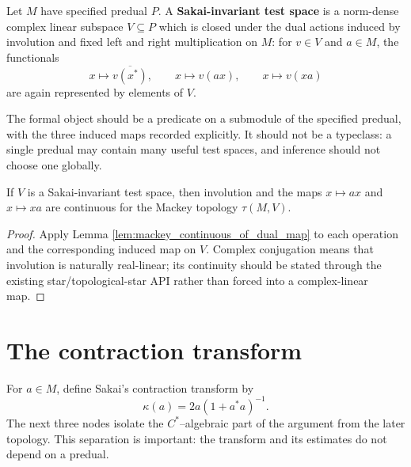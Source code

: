 \begin{definition}
  \label{def:sakai_invariant_test_space}
  \leanok
  Let $M$ have specified predual $P$.  A \textbf{Sakai-invariant test space} is a norm-dense
  complex linear subspace $V\subseteq P$ which is closed under the dual actions induced by
  involution and fixed left and right multiplication on $M$: for $v\in V$ and $a\in M$, the
  functionals
  \[
    x\longmapsto \overline{v(x^{*})},\qquad
    x\longmapsto v(ax),\qquad
    x\longmapsto v(xa)
  \]
  are again represented by elements of $V$.
\end{definition}

The formal object should be a predicate on a submodule of the specified predual, with the three
induced maps recorded explicitly.  It should not be a typeclass: a single predual may contain many
useful test spaces, and inference should not choose one globally.

\begin{lemma}
  \label{lem:tau_continuity_of_sakai_invariant}
  \leanok
  If $V$ is a Sakai-invariant test space, then involution and the maps
  $x\mapsto ax$ and $x\mapsto xa$ are continuous for the Mackey topology $\tau(M,V)$.
\end{lemma}

\begin{proof}
  \leanok
  Apply Lemma \ref{lem:mackey_continuous_of_dual_map} to each operation and the corresponding
  induced map on $V$.  Complex conjugation means that involution is naturally real-linear; its
  continuity should be stated through the existing star/topological-star API rather than forced
  into a complex-linear map.
\end{proof}

\section{The contraction transform}

For $a\in M$, define Sakai's contraction transform by
\[
  \kappa(a)=2a(1+a^{*}a)^{-1}.
\]
The next three nodes isolate the $C^{*}$--algebraic part of the argument from the later topology.
This separation is important: the transform and its estimates do not depend on a predual.

